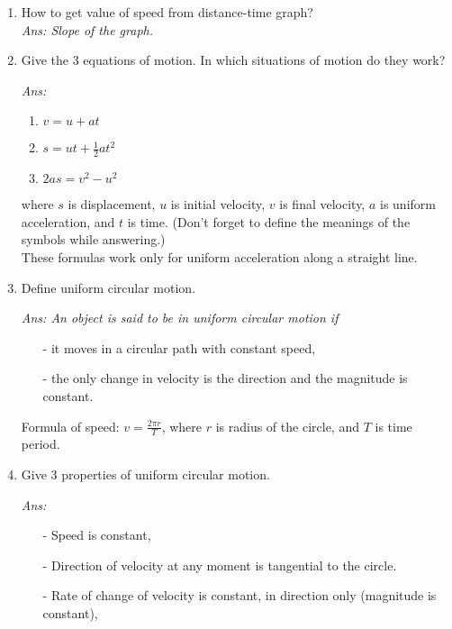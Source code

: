 \documentclass[12pt]{article}
\begin{document}
\begin{enumerate}
{		}
	\item How to get value of speed from distance-time graph? \\
		{\itshape Ans: Slope of the graph.}
	\item Give the 3 equations of motion. In which situations of motion do they work? \\ 
		{\itshape Ans: 
			\begin{enumerate}
				\item $ v = u + at $
				\item $ s = ut + \frac{1}{2}at^2 $
				\item $ 2as = v^2 - u^2 $
			\end{enumerate}
		where $ s $ is displacement, $ u $ is initial velocity, $ v $ is final velocity, $ a $ is uniform acceleration, and $ t $ is time. (Don't forget to define the meanings of the symbols while answering.) \\
		These formulas work only for uniform acceleration along a straight line.

		}
	\item Define uniform circular motion. \\
		{\itshape Ans: An object is said to be in uniform circular motion if 
			\begin{itemize}
				\item[-] it moves in a circular path with constant speed,
				\item[-] the only change in velocity is the direction and the magnitude is constant.
			\end{itemize}
			Formula of speed: $ v = \frac{2 \pi r}{T} $, where $ r $ is radius of the circle, and $ T $ is time period.
	}
	\item Give 3 properties of uniform circular motion. \\
		{\itshape Ans:
			\begin{itemize}
				\item[-] Speed is constant,
				\item[-] Direction of velocity at any moment is tangential to the circle.
				\item[-] Rate of change of velocity is constant, in direction only (magnitude is constant),
			\end{itemize}
		}
\end{enumerate}
\end{document}
